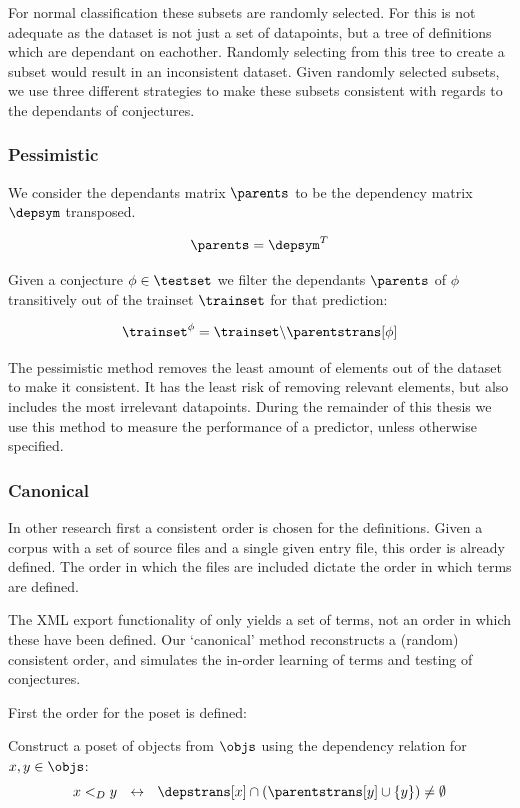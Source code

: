 For normal classification these subsets are randomly selected.
For \premiseselection this is not adequate as the dataset is not just a set of datapoints, but a tree of definitions which are dependant on eachother.
Randomly selecting from this tree to create a subset would result in an inconsistent dataset.
Given randomly selected subsets, we use three different strategies to make these subsets consistent with regards to the dependants of conjectures.

\subsubsection{Pessimistic}
We consider the dependants matrix $\parents$ to be the dependency matrix $\depsym$ transposed.
\begin{definition}
  \[
    \parents = \depsym^{T}
  \]
\end{definition}

Given a conjecture $\phi \in \testset$ we filter the dependants $\parents$ of $\phi$ transitively out of the trainset $\trainset$ for that prediction:
\begin{definition}
  \[
    \trainset^{\phi} = \trainset \backslash \parentstrans[\phi]
  \]
\end{definition}
The pessimistic method removes the least amount of elements out of the dataset to make it consistent.
It has the least risk of removing relevant elements, but also includes the most irrelevant datapoints.
During the remainder of this thesis we use this method to measure the performance of a predictor, unless otherwise specified.

\subsubsection{Canonical}
In other research first a consistent order is chosen for the definitions.
Given a corpus with a set of source files and a single given entry file, this order is already defined.
The order in which the files are included dictate the order in which terms are defined.

The XML export functionality of \coq only yields a set of terms, not an order in which these have been defined.
Our `canonical' method reconstructs a (random) consistent order, and simulates the in-order learning of terms and testing of conjectures.

First the order for the poset is defined:
\begin{definition}
  Construct a poset of objects from $\objs$ using the dependency relation for $x, y \in \objs$:
  \[
    x <_D y ~~\leftrightarrow~~ \depstrans[x] \cap (\parentstrans[y] \cup \{y\}) \neq \emptyset
  \]
\end{definition}

